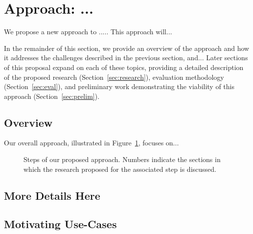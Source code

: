 \section{Approach: ...}
\label{sec:approach}

We propose a new approach to .....
This approach will... 

In the remainder of this section, we provide an overview of the approach and how it 
addresses the challenges described in the previous section, and...
Later sections of this proposal
expand on each of these topics, providing a detailed description of the
proposed research (Section~\ref{sec:research}), evaluation methodology
(Section~\ref{sec:eval}), and preliminary work demonstrating the viability of
this approach (Section~\ref{sec:prelim}).

\subsection{Overview}
Our overall approach, illustrated in Figure~\ref{fig:overview}, focuses on...
\begin{figure}
\begin{center}
\end{center}
\caption{Steps of our proposed approach. Numbers indicate the sections in which the research 
  proposed for the associated step is discussed.}
\label{fig:overview}
\end{figure}

\subsection{More Details Here}

\subsection{Motivating Use-Cases}

